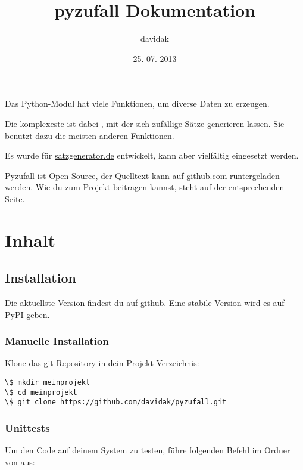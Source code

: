 \documentclass[a4paper,12pt,oneside]{sphinxmanual}
\title{pyzufall Dokumentation}
\date{25. 07. 2013}
\author{davidak}
\begin{document}
\maketitle
\tableofcontents
{}\label{index::doc}


Das Python-Modul {\hyperref[funktionen:module-pyzufall]{}} hat viele Funktionen, um diverse Daten zu erzeugen.

Die komplexeste ist dabei {\hyperref[funktionen:pyzufall.satz]{}}, mit der sich zufällige Sätze generieren lassen. Sie benutzt dazu die meisten anderen Funktionen.

Es wurde für \href{http://satzgenerator.de/}{satzgenerator.de} entwickelt, kann aber vielfältig eingesetzt werden.

Pyzufall ist Open Source, der Quelltext kann auf \href{https://github.com/davidak/pyzufall/}{github.com} runtergeladen werden. Wie du zum Projekt beitragen kannst, steht auf der entsprechenden Seite.


\chapter{Inhalt}
\label{index:inhalt}\label{index:dokumentation-von-pyzufall}

\section{Installation}
\label{installation:installation}\label{installation::doc}
Die aktuellste Version findest du auf \href{https://github.com/davidak/pyzufall}{github}. Eine stabile Version wird es auf \href{https://pypi.python.org/}{PyPI} geben.


\subsection{Manuelle Installation}
\label{installation:manuelle-installation}
Klone das git-Repository in dein Projekt-Verzeichnis:

\begin{Verbatim}[commandchars=\\\{\}]
\$ mkdir meinprojekt
\$ cd meinprojekt
\$ git clone https://github.com/davidak/pyzufall.git
\end{Verbatim}


\subsection{Unittests}
\label{installation:unittests}
Um den Code auf deinem System zu testen, führe folgenden Befehl im Ordner von {\hyperref[funktionen:module-pyzufall]{}} aus:
\end{document}
